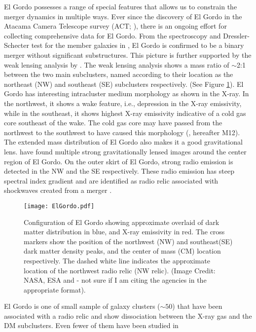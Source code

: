 El Gordo possesses a range of special features that allows us to constrain
the merger dynamics in multiple ways.  Ever since the discovery of El Gordo
in the Atacama Camera Telescope survey (ACT; \citealt{Marriage11}), there is an ongoing effort for
collecting comprehensive data for El Gordo.
From the spectroscopy and Dressler-Schecter test for the member galaxies
in \cite{Sifon13}, El Gordo is confirmed to be a binary merger 
without significant substructures. This picture is further supported by the
weak lensing analysis by \cite{Jee13}. The weak lensing analysis shows
a mass ratio of $\sim$2:1  between the two main subclusters, named according to their location as the northeast (NW) and southeast (SE) subclusters respectively. 
(See Figure \ref{fig:config}). El Gordo has interesting intracluster medium morphology as shown in the X-ray. In the northwest, it shows a wake feature, i.e.,
depression in the X-ray emissivity, while in the southeast, it shows
highest X-ray emissivity indicative of a cold gas core southeast of the
wake. The cold gas core may have passed from the northwest to the southwest
to have caused this morphology (\citealt{M12}, hereafter M12). 
The extended mass distribution of El Gordo also makes it a good
gravitational lens. \cite{Zitrin13} have found multiple strong
gravitationally lensed images around the center region of El Gordo. 
On the outer skirt of El Gordo, strong radio emission is detected in
the NW and the SE respectively. These radio emission has steep spectral
index gradient and are identified as radio relic associated with shockwaves
created from a merger \citep{L13}. 
\begin{figure}
	\texttt{[image: ElGordo.pdf]}
	\caption{Configuration of El Gordo showing approximate overlaid of dark
		matter distribution in blue, and X-ray emissivity in red. The cross
		markers show the position of the northwest (NW) and southeast(SE) dark
		matter density peaks, and the center of mass (CM) location respectively.   
		The dashed white line indicates the approximate location of the northwest 
		radio relic (NW relic).
		(Image Credit: NASA, ESA and \citealt{Jee13} - not sure if I am citing
		the agencies in the appropriate format). 
		\label{fig:config}}
\end{figure}
El Gordo is one of small sample of galaxy clusters ($\sim50$) that have
been associated with a radio relic and show dissociation between the X-ray
gas and the DM subclusters. Even fewer of them have been studied in
